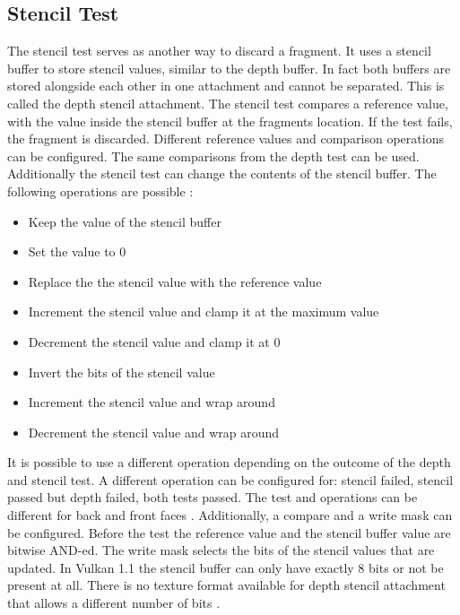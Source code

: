 \subsection{Stencil Test}
\label{section:stenciltest}

The stencil test serves as another way to discard a fragment. It uses a stencil buffer to store stencil values, similar to the depth buffer. In fact both buffers are stored alongside each other in one attachment and cannot be separated. This is called the depth stencil attachment. The stencil test compares a reference value, with the value inside the stencil buffer at the fragments location. If the test fails, the fragment is discarded. Different reference values and comparison operations can be configured. The same comparisons from the depth test can be used. Additionally the stencil test can change the contents of the stencil buffer. The following operations are possible \cite{sellers:vulkanprogramming}:
\begin{itemize}
	\item Keep the value of the stencil buffer
	\item Set the value to 0
	\item Replace the the stencil value with the reference value
	\item Increment the stencil value and clamp it at the maximum value
	\item Decrement the stencil value and clamp it at 0
	\item Invert the bits of the stencil value
	\item Increment the stencil value and wrap around
	\item Decrement the stencil value and wrap around	
\end{itemize}

It is possible to use a different operation depending on the outcome of the depth and stencil test. A different operation can be configured for: stencil failed, stencil passed but depth failed, both tests passed. The test and operations can be different for back and front faces \cite{sellers:vulkanprogramming}. Additionally, a compare and a write mask can be configured. Before the test the reference value and the stencil buffer value are bitwise AND-ed. The write mask selects the bits of the stencil values that are updated. In Vulkan 1.1 the stencil buffer can only have exactly 8 bits or not be present at all. There is no texture format available for depth stencil attachment that allows a different number of bits \cite{khronos:vulkan:spec1.1}.

